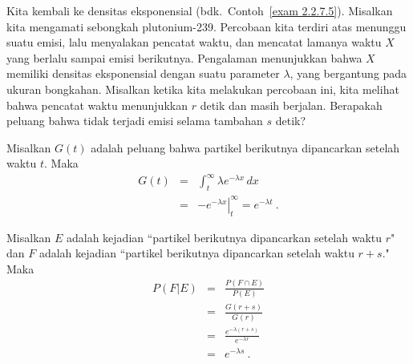 \begin{example}\label{exam 4.14}
Kita kembali ke densitas eksponensial (bdk.\ Contoh~\ref{exam 2.2.7.5}).  Misalkan kita mengamati sebongkah
plutonium-239.  Percobaan kita terdiri atas menunggu suatu emisi, lalu menyalakan pencatat waktu, dan
mencatat lamanya waktu $X$ yang berlalu sampai emisi berikutnya.   Pengalaman menunjukkan bahwa
$X$ memiliki densitas eksponensial dengan suatu parameter $\lambda$, yang bergantung pada ukuran
bongkahan.  Misalkan ketika kita melakukan percobaan ini, kita melihat bahwa pencatat waktu menunjukkan $r$ detik
dan masih berjalan.  Berapakah peluang bahwa tidak terjadi emisi selama tambahan $s$ detik?

Misalkan $G(t)$ adalah peluang bahwa partikel berikutnya dipancarkan setelah waktu $t$.  Maka
\begin{eqnarray*}
G(t) & = & \int_t^\infty \lambda e^{-\lambda x}\,dx \\
     & = & \left.-e^{-\lambda x}\right|_t^\infty = e^{-\lambda t}\ .
\end{eqnarray*}

Misalkan $E$ adalah kejadian ``partikel berikutnya dipancarkan setelah waktu $r$" dan $F$ adalah kejadian ``partikel
berikutnya dipancarkan setelah waktu $r + s$."  Maka
\begin{eqnarray*}
P(F|E) & = & \frac {P(F \cap E)}{P(E)} \\
       & = & \frac {G(r + s)}{G(r)} \\
       & = & \frac {e^{-\lambda(r + s)}}{e^{-\lambda r}} \\
       & = & e^{-\lambda s}\ .
\end{eqnarray*}



\end{example}

